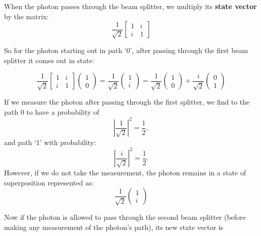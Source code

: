 \documentclass[12pt]{article}
\begin{document}
When the photon passes through the beam splitter, we multiply its \textbf{state vector} by the matrix:
\begin{equation}
    \frac{1}{\sqrt{2}}
    \begin{bmatrix} 
    1 & i \\ 
    i & 1 
    \end{bmatrix}
\end{equation}

So for the photon starting out in path ‘0’, after passing through the first beam splitter it comes out in state:

\begin{equation}
    \frac{1}{\sqrt{2}}
    \begin{bmatrix} 
    1 & i \\ 
    i & 1 
    \end{bmatrix}
    \begin{pmatrix} 1 \\ 0 \end{pmatrix} =
    \frac{1}{\sqrt{2}}
    \begin{pmatrix} 
    1 \\ i 
    \end{pmatrix} =
    \frac{1}{\sqrt{2}}
    \begin{pmatrix} 
    1 \\ 0 
    \end{pmatrix} +
    \frac{i}{\sqrt{2}}
    \begin{pmatrix} 
    0 \\ 1 
    \end{pmatrix}
\end{equation}

If we measure the photon after passing through the first splitter, we find to the path 0 to have a probability of \[
\left| \frac{1}{\sqrt{2}} \right|^2 = \frac{1}{2},
\]
and path ‘1’ with probability:
\[
\left| \frac{i}{\sqrt{2}} \right|^2 = \frac{1}{2}.
\]
However, if we do not take the measurement, the photon remains in a state of superposition represented as:
\begin{equation}
    \frac{1}{\sqrt{2}}
    \begin{pmatrix} 
    1 \\ i 
    \end{pmatrix}
\end{equation}

Now if the photon is allowed to pass through the second beam splitter (before making any measurement of the photon’s path), its new state vector is
\end{document}
